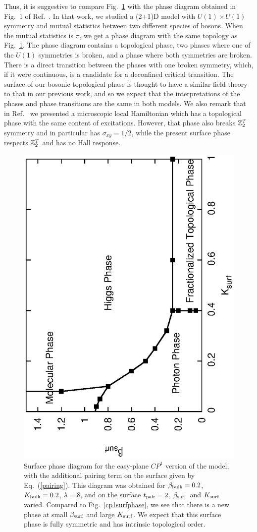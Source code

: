 Thus, it is suggestive to compare Fig.~\ref{cp1surfpair} with the phase diagram obtained in Fig.~1 of Ref.~\cite{Loopy}. In that work, we studied a (2+1)D model with $U(1)\times U(1)$ symmetry and mutual statistics between two different species of bosons. When the mutual statistics is $\pi$, we get a phase diagram with the same topology as Fig.~\ref{cp1surfpair}. The phase diagram contains a topological phase, two phases where one of the $U(1)$ symmetries is broken, and a phase where both symmetries are broken. There is a direct transition between the phases with one broken symmetry, which, if it were continuous, is a candidate for a deconfined critical transition.\cite{Gen2Loops} The surface of our bosonic topological phase is thought to have a similar field theory to that in our previous work,\cite{Loopy,Gen2Loops} and so we expect that the interpretations of the phases and phase transitions are the same in both models. We also remark that in Ref.~\cite{FQHE} we presented a microscopic local Hamiltonian which has a topological phase with the same content of excitations. However, that phase also breaks $\mathbb{Z}_2^T$ symmetry and in particular has $\sigma_{xy}=1/2$, while the present surface phase respects $\mathbb{Z}_2^T$ and has no Hall response.




\begin{figure}
\includegraphics[angle=-90,width=0.6\linewidth]{figures/cp1surfacepairing.eps}
\caption{Surface phase diagram for the easy-plane $CP^1$ version of the model, with the additional pairing term on the surface given by Eq.~(\ref{pairing}). This diagram was obtained for $\beta_{\rm bulk}=0.2$, $K_{\rm bulk}=0.2$, $\lambda=8$, and on the surface $t_{\rm pair}=2$, $\beta_{\rm surf}$ and $K_{\rm surf}$ varied. Compared to Fig.~\ref{cp1surfphase}, we see that there is a new phase at small $\beta_{\rm surf}$ and large $K_{\rm surf}$.  We expect that this surface phase is fully symmetric and has intrinsic topological order.
}
\label{cp1surfpair}
\end{figure}

